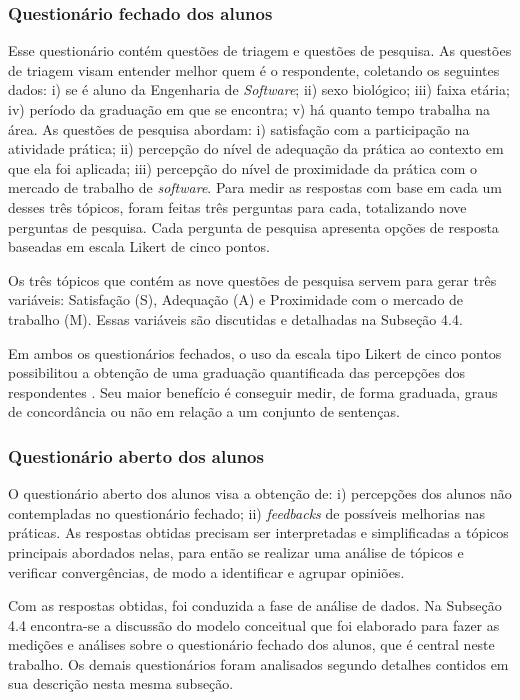 \subsubsection{Questionário fechado dos alunos}

Esse questionário contém questões de triagem e questões de pesquisa. As questões de triagem visam entender melhor quem é o respondente, coletando os seguintes dados: i) se é aluno da Engenharia de \textit{Software}; ii) sexo biológico; iii) faixa etária; iv) período da graduação em que se encontra; v) há quanto tempo trabalha na área. As questões de pesquisa abordam: i) satisfação com a participação na atividade prática; ii) percepção do nível de adequação da prática ao contexto em que ela foi aplicada; iii) percepção do nível de proximidade da prática com o mercado de trabalho de \textit{software}. Para medir as respostas com base em cada um desses três tópicos, foram feitas três perguntas para cada, totalizando nove perguntas de pesquisa. Cada pergunta de pesquisa apresenta opções de resposta baseadas em escala Likert de cinco pontos.

Os três tópicos que contém as nove questões de pesquisa servem para gerar três variáveis: Satisfação (S), Adequação (A) e Proximidade com o mercado de trabalho (M). Essas variáveis são discutidas e detalhadas na Subseção 4.4.

Em ambos os questionários fechados, o uso da escala tipo Likert de cinco pontos possibilitou a obtenção de uma graduação quantificada das percepções dos respondentes \cite{marconi2003fundamentos}. Seu maior benefício é conseguir medir, de forma graduada, graus de concordância ou não em relação a um conjunto de sentenças.

\subsubsection{Questionário aberto dos alunos}

O questionário aberto dos alunos visa a obtenção de: i) percepções dos alunos não contempladas no questionário fechado; ii) \textit{feedbacks} de possíveis melhorias nas práticas. As respostas obtidas precisam ser interpretadas e simplificadas a tópicos principais abordados nelas, para então se realizar uma análise de tópicos e verificar convergências, de modo a identificar e agrupar opiniões.

Com as respostas obtidas, foi conduzida a fase de análise de dados. Na Subseção 4.4 encontra-se a discussão do modelo conceitual que foi elaborado para fazer as medições e análises sobre o questionário fechado dos alunos, que é central neste trabalho. Os demais questionários foram analisados segundo detalhes contidos em sua descrição nesta mesma subseção.

